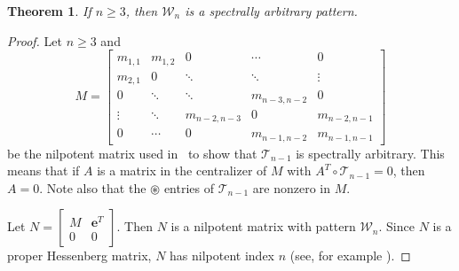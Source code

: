 \documentclass[10pt]{amsart}
\newtheorem{theorem}[proposition]{Theorem}
\begin{document}
\begin{theorem}
If $n\geq 3$, then ${\mathcal{W}}_{n}$ is a spectrally arbitrary pattern.
\end{theorem}

\begin{proof} Let $n\geq 3$ and
    $$M = \left[ \begin{array}{ccccc}
m_{1, 1}& m_{1, 2} 	& 0		    & \cdots    & 0 \\
m_{2, 1}& 0 		& \ddots 	& \ddots    & \vdots \\
0 		& \ddots 	& \ddots 	&m_{n-3, n-2}	& 0 \\
\vdots 	& \ddots    & m_{n-2, n-3} 	& 0 	    & m_{n-2, n-1} \\
0 		& \cdots	& 0 		&m_{n-1, n-2}	& m_{n-1, n-1} \end{array} \right]$$ be the nilpotent matrix used in~\cite[Corollary~8]{GS} to show that ${\mathcal{T}}_{n-1}$ is spectrally arbitrary.  This means that if $A$ is a matrix in the centralizer
of $M$ with $A^T\circ{\mathcal{T}}_{n-1}=0$, then $A=0$.
Note also that the ${\circledast}$ entries of 
${\mathcal{T}}_{n-1}$ are nonzero in $M$. 

Let $N = \left[ \begin{array}{cc}
M & \mathbf{e}^T \\
0 	& 0 \end{array} \right].$  Then $N$ 
is a nilpotent matrix with pattern ${\mathcal{W}}_{n}$. 
Since $N$ is a proper Hessenberg matrix,
$N$ has nilpotent index $n$ (see, for example \cite[Theorem 7.4.4]{GV}).


\end{proof}
\end{document}
